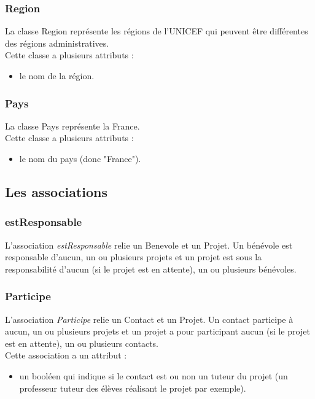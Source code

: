 \subsubsection*{Region}

La classe Region représente les régions de l'UNICEF qui peuvent être différentes des régions administratives.\\
Cette classe a plusieurs attributs :
\begin{itemize}
\item le nom de la région.
\end{itemize}

\subsubsection*{Pays}

La classe Pays représente la France.\\
Cette classe a plusieurs attributs :
\begin{itemize}
\item le nom du pays (donc "France").
\end{itemize}


\subsection{Les associations}

\subsubsection*{estResponsable}
L'association \textit{estResponsable} relie un Benevole et un Projet. Un bénévole est responsable d'aucun, un ou plusieurs projets et un projet est sous la responsabilité d'aucun (si le projet est en attente), un ou plusieurs bénévoles.

\subsubsection*{Participe}
L'association \textit{Participe} relie un Contact et un Projet. Un contact participe à aucun, un ou plusieurs projets et un projet a pour participant aucun (si le projet est en attente), un ou plusieurs contacts.\\
Cette association a un attribut :
\begin{itemize}
\item un booléen qui indique si le contact est ou non un tuteur du projet (un professeur tuteur des élèves réalisant le projet par exemple). 
\end{itemize}

